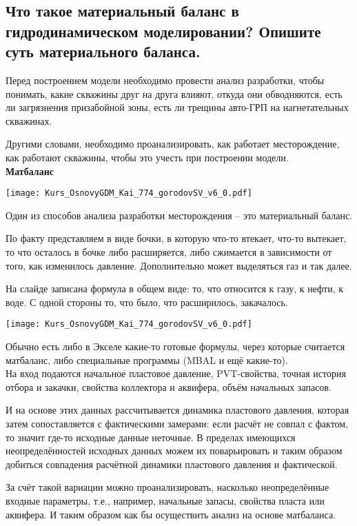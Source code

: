 

\subsection{Что такое материальный баланс в гидродинамическом моделировании? Опишите суть материального баланса.}

Перед построением модели необходимо провести анализ разработки, чтобы понимать, какие скважины друг на друга влияют, откуда они обводняются, есть ли загрязнения призабойной зоны, есть ли трещины авто-ГРП на нагнетательных скважинах.

Другими словами, необходимо проанализировать, как работает месторождение, как работают скважины, чтобы это учесть при построении модели.
\\

\textbf{Матбаланс}

\texttt{[image: Kurs\_OsnovyGDM\_Kai\_774\_gorodovSV\_v6\_0.pdf]}

Один из способов анализа разработки месторождения -- это материальный баланс.

По факту представляем в виде бочки, в которую что-то втекает, что-то вытекает, то что осталось в бочке либо расширяется, либо сжимается в зависимости от того, как изменилось давление.
Дополнительно может выделяться газ и так далее.

На слайде записана формула в общем виде: то, что относится к газу, к нефти, к воде.
С одной стороны то, что было, что расширилось, закачалось.

\texttt{[image: Kurs\_OsnovyGDM\_Kai\_774\_gorodovSV\_v6\_0.pdf]}

Обычно есть либо в Экселе какие-то готовые формулы, через которые считается матбаланс, либо специальные программы (MBAL и ещё какие-то).
\\

На вход подаются начальное пластовое давление, PVT-свойства, точная история отбора и закачки, свойства коллектора и аквифера, объём начальных запасов.

И на основе этих данных рассчитывается динамика пластового давления, которая затем сопоставляется с фактическими замерами: если расчёт не совпал с фактом, то значит где-то исходные данные неточные.
В пределах имеющихся неопределённостей исходных данных можем их поварьировать и таким образом добиться совпадения расчётной динамики пластового давления и фактической.

За счёт такой вариации можно проанализировать, насколько неопределённые входные параметры, т.е., например, начальные запасы, свойства пласта или аквифера.
И таким образом как бы осуществить анализ на основе матбаланса.
\\

